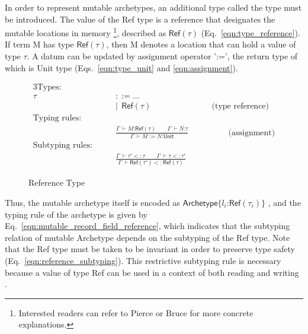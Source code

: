 \documentclass[preprint,3p,onecolumn,times,review]{article}
\begin{document}
{In order to represent mutable archetypes, an additional type called the {} type must be introduced. 
The value of the {\sf Ref} type is a reference that designates the mutable locations in memory \footnote{Interested readers can refer to Pierce \cite[p.159]{pierce02:_types_progr_languag} or Bruce \cite[p.77]{bruce02:_found_objec_orien_languag} for more concrete explanations.}, described as $\mathsf{Ref(\tau)}$ (Eq.~\ref{eqn:type_reference}). 
If term M has type $\mathsf{Ref(\tau)}$, then M denotes a location that can hold a value of type $\tau$. 
A datum can be updated by assignment operator ':=', the return type of which is {\sf Unit} type (Eqs.~\ref{eqn:type_unit} and \ref{eqn:assignment}).

\begin{figure}[!htbp]
\begin{alignat}{3}
  \text{Types:} \qquad   \nonumber\\
                        \tau~ & {::= \dots }\\
                              & | ~~ \mathsf{Ref(\tau)}                           & \qquad \label{eqn:type_reference} \text{(type reference)}\\
  \text{Typing rules:} \qquad   \nonumber\\
                              & \frac{\Gamma~ \vdash M\text{:}\mathsf{Ref(\tau)} \qquad \Gamma~ \vdash N\text{:}\tau}
                                      {\Gamma ~ \vdash M := N\text{:}\mathsf{Unit}} & \label{eqn:assignment} \qquad\qquad \text{(assignment)}\\
  \text{Subtyping rules:} \qquad   \nonumber\\
                              & \frac{\Gamma ~ \vdash \tau' <: \tau \qquad \Gamma ~ \vdash \tau <: \tau'}
                                     {\Gamma ~ \vdash \mathsf{Ref(\tau')} <: \mathsf{Ref(\tau)}} \label{eqn:reference_subtyping}
\end{alignat}
\caption{Reference Type}\label{fig:reference_type}
\end{figure}

Thus, the mutable archetype itself is encoded as $\mathsf{Archetype}\{l_i \text{:} \mathsf{Ref}(\tau_i)\}$ \cite[p.19]{cardelli04:_type_system}, and the typing rule of the archetype is given by Eq.~\ref{eqn:mutable_record_field_reference}, which indicates that the subtyping relation of mutable Archetype depends on the subtyping of the {\sf Ref} type. 
  Note that the {\sf Ref} type must be taken to be invariant in order to preserve type safety (Eq.~{\ref{eqn:reference_subtyping}}). This restrictive subtyping rule is necessary because a value of type {\sf Ref} can be used in a context of both reading and writing \cite[p.198]{pierce02:_types_progr_languag}\cite[p.29]{cardelli04:_type_system}.

}
\end{document}
